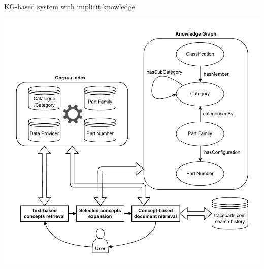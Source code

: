 \begin{frame}{KG-based system with implicit knowledge}

        \begin{center}
            \includegraphics[scale=0.5]{images/tp-expe-kg-based-search-hist-sys.pdf} 
    \end{center}

\end{frame}

